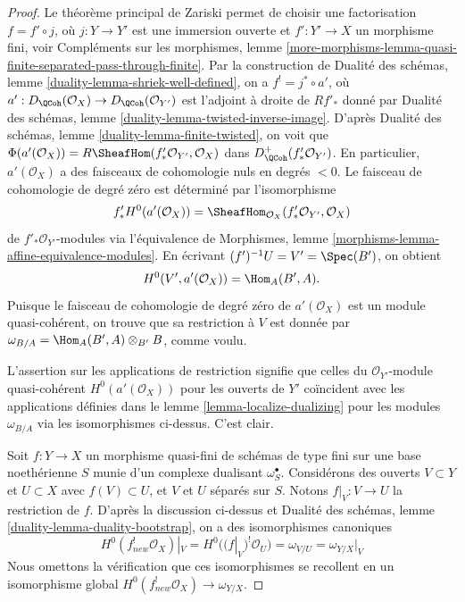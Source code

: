 \begin{proof}
Le théorème principal de Zariski permet de choisir une factorisation $f = f' \circ j$,
où $j : Y \to Y'$ est une immersion ouverte et $f' : Y' \to X$ un morphisme
fini, voir Compléments sur les morphismes, lemme
\ref{more-morphisms-lemma-quasi-finite-separated-pass-through-finite}.
Par la construction de
Dualité des schémas, lemme \ref{duality-lemma-shriek-well-defined}, on a
$f^! = j^* \circ a'$, où
$a' : D_\QCoh(\mathcal{O}_X) \to D_\QCoh(\mathcal{O}_{Y'})$
est l'adjoint à droite de $Rf'_*$ donné par
Dualité des schémas, lemme \ref{duality-lemma-twisted-inverse-image}.
D'après Dualité des schémas, lemme \ref{duality-lemma-finite-twisted},
on voit que
$\Phi(a'(\mathcal{O}_X)) = R\SheafHom(f'_*\mathcal{O}_{Y'}, \mathcal{O}_X)$ dans
$D_\QCoh^+(f'_*\mathcal{O}_{Y'})$. En particulier, $a'(\mathcal{O}_X)$ a des
faisceaux de cohomologie nuls en degrés $< 0$. Le faisceau de cohomologie de degré zéro
est déterminé par l'isomorphisme
$$
f'_*H^0(a'(\mathcal{O}_X)) =
\SheafHom_{\mathcal{O}_X}(f'_*\mathcal{O}_{Y'}, \mathcal{O}_X)
$$
de $f'_*\mathcal{O}_{Y'}$-modules via l'équivalence de
Morphismes, lemme \ref{morphisms-lemma-affine-equivalence-modules}.\newline
En écrivant $(f')^{-1}U = V' = \Spec(B')$, on obtient
$$
H^0(V', a'(\mathcal{O}_X)) = \Hom_A(B', A).
$$
Puisque le faisceau de cohomologie de degré zéro de $a'(\mathcal{O}_X)$
est un module quasi-cohérent, on trouve que
sa restriction à $V$ est donnée par
$\omega_{B/A} = \Hom_A(B', A) \otimes_{B'} B$, comme voulu.

\medskip\noindent
L'assertion sur les applications de restriction signifie que celles
du $\mathcal{O}_{Y'}$-module quasi-cohérent $H^0(a'(\mathcal{O}_X))$
pour les ouverts de $Y'$ coïncident avec les applications définies dans le
lemme \ref{lemma-localize-dualizing}
pour les modules $\omega_{B/A}$ via les isomorphismes ci-dessus.
C'est clair.

\medskip\noindent
Soit $f : Y \to X$ un morphisme quasi-fini de schémas de type fini
sur une base noethérienne $S$ munie d'un complexe dualisant $\omega_S^\bullet$.
Considérons des ouverts $V \subset Y$ et $U \subset X$ avec $f(V) \subset U$,
et $V$ et $U$ séparés sur $S$. Notons $f|_V : V \to U$ la restriction
de $f$. D'après la discussion ci-dessus et
Dualité des schémas, lemme \ref{duality-lemma-duality-bootstrap},
on a des isomorphismes canoniques
$$
H^0(f_{new}^!\mathcal{O}_X)|_V = H^0((f|_V)^!\mathcal{O}_U) = \omega_{V/U} =
\omega_{Y/X}|_V
$$
Nous omettons la vérification que ces isomorphismes se recollent en un isomorphisme
global $H^0(f_{new}^!\mathcal{O}_X) \to \omega_{Y/X}$.
\end{proof}


